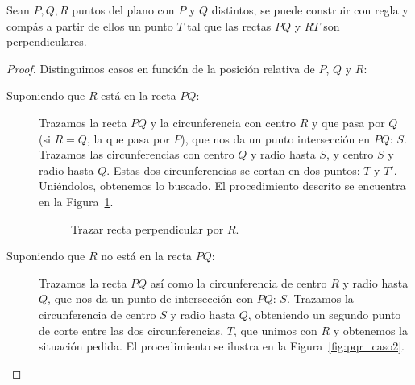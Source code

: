 \begin{lema}
    Sean $P,Q,R$ puntos del plano con $P$ y $Q$ distintos, se puede construir con regla y compás a partir de ellos un punto $T$  tal que las rectas $PQ$ y $RT$ son perpendiculares.
    \begin{proof}
        Distinguimos casos en función de la posición relativa de $P$, $Q$ y $R$:
        \begin{description}
            \item [Suponiendo que $R$ está en la recta $PQ$:] Trazamos la recta $PQ$ y la circunferencia con centro $R$ y que pasa por $Q$ (si $R=Q$, la que pasa por $P$), que nos da un punto intersección en $PQ$: $S$. Trazamos las circunferencias con centro $Q$ y radio hasta $S$, y centro $S$ y radio hasta $Q$. Estas dos circunferencias se cortan en dos puntos: $T$ y $T'$. Uniéndolos, obtenemos lo buscado. El procedimiento descrito se encuentra en la Figura~\ref{fig:pqr_caso1}.
            \begin{figure}
                \centering
                    \caption{Trazar recta perpendicular por $R$.}
                    \label{fig:pqr_caso1}
            \end{figure}
            \item [Suponiendo que $R$ no está en la recta $PQ$:]
                Trazamos la recta $PQ$ así como la circunferencia de centro $R$ y radio hasta $Q$, que nos da un punto de intersección con $PQ$: $S$. Trazamos la circunferencia de centro $S$ y radio hasta $Q$, obteniendo un segundo punto de corte entre las dos circunferencias, $T$, que unimos con $R$ y obtenemos la situación pedida. El procedimiento se ilustra en la Figura~\ref{fig:pqr_caso2}.
            \begin{figure}
                \centering
\end{figure}
\end{description}
\end{proof}
\end{lema}
